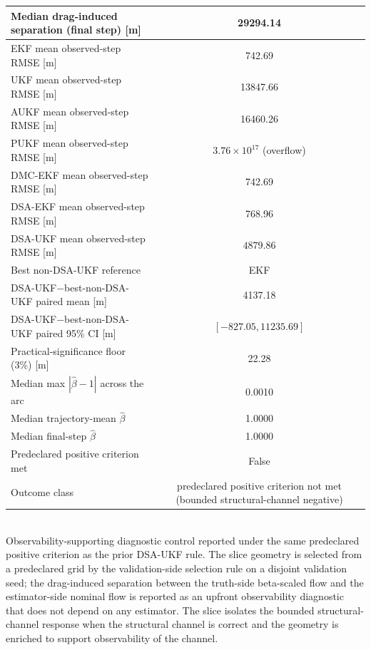 \begin{table}[!htbp]
{\begin{tabular}{lc}
    Median drag-induced separation (final step) [m] & 29294.14 \\
    \midrule
    EKF mean observed-step RMSE [m] & 742.69 \\
    UKF mean observed-step RMSE [m] & 13847.66 \\
    AUKF mean observed-step RMSE [m] & 16460.26 \\
    PUKF mean observed-step RMSE [m] & $3.76\times10^{17}$ (overflow) \\
    DMC-EKF mean observed-step RMSE [m] & 742.69 \\
    DSA-EKF mean observed-step RMSE [m] & 768.96 \\
    DSA-UKF mean observed-step RMSE [m] & $\mathbf{4879.86}$ \\
    \midrule
    Best non-DSA-UKF reference & EKF \\
    DSA-UKF$-$best-non-DSA-UKF paired mean [m] & 4137.18 \\
    DSA-UKF$-$best-non-DSA-UKF paired 95\% CI [m] & $[-827.05, 11235.69]$ \\
    Practical-significance floor (3\%) [m] & 22.28 \\
    Median max $|\hat{\beta}-1|$ across the arc & 0.0010 \\
    Median trajectory-mean $\hat{\beta}$ & 1.0000 \\
    Median final-step $\hat{\beta}$ & 1.0000 \\
    Predeclared positive criterion met & False \\
    Outcome class & predeclared positive criterion not met (bounded structural-channel negative) \\
    \bottomrule
  \end{tabular}
  }
  \\[2pt] {\footnotesize Observability-supporting diagnostic control reported under the same predeclared positive criterion as the prior DSA-UKF rule. The slice geometry is selected from a predeclared grid by the validation-side selection rule on a disjoint validation seed; the drag-induced separation between the truth-side beta-scaled flow and the estimator-side nominal flow is reported as an upfront observability diagnostic that does not depend on any estimator. The slice isolates the bounded structural-channel response when the structural channel is correct and the geometry is enriched to support observability of the channel.}
\end{table}